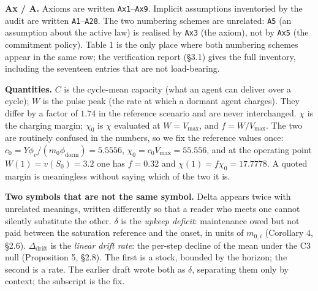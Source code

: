 \documentclass[11pt,a4paper]{article}
\begin{document}
\textbf{Ax / A.} Axioms are written \texttt{Ax1}--\texttt{Ax9}. Implicit assumptions inventoried by
the audit are written \texttt{A1}--\texttt{A28}. The two numbering schemes are unrelated:
\texttt{A5} (an assumption about the active law) is realised by \texttt{Ax3} (the axiom), not
by \texttt{Ax5} (the commitment policy). Table 1 is the only place where both numbering
schemes appear in the same row; the verification report (§3.1) gives the full
inventory, including the seventeen entries that are not load-bearing.

\textbf{Quantities.} \(C\) is the cycle-mean capacity (what an agent can deliver over a
cycle); \(W\) is the pulse peak (the rate at which a dormant agent charges).
They differ by a factor of \(1.74\) in the reference scenario and are never
interchanged. \(\chi\) is the charging margin; \(\chi_0\) is \(\chi\) evaluated at
\(W=V_{\max}\), and \(f=W/V_{\max}\). The two are routinely confused in the numbers,
so we fix the reference values once: \(c_0=Y\phi_v/(m_0\phi_{\mathrm{dorm}})=5.5556\),
\(\chi_0=c_0V_{\max}=55.556\), and at the operating point \(W(1)=v(S_0)=3.2\) one has
\(f=0.32\) and \(\chi(1)=f\chi_0=17.7778\). A quoted margin is meaningless without
saying which of the two it is.

\textbf{Two symbols that are not the same symbol.} Delta appears twice with unrelated
meanings, written differently so that a reader who meets one cannot silently
substitute the other. \(\delta\) is the \emph{upkeep deficit}: maintenance owed but not
paid between the saturation reference and the onset, in units of \(m_{0,i}\)
(Corollary 4, §2.6). \(\Delta_{\mathrm{drift}}\) is the \emph{linear drift rate}: the
per-step decline of the mean under the C3 null (Proposition 5, §2.8). The first
is a stock, bounded by the horizon; the second is a rate. The earlier draft wrote
both as \(\delta\), separating them only by context; the subscript is the fix.
\end{document}

